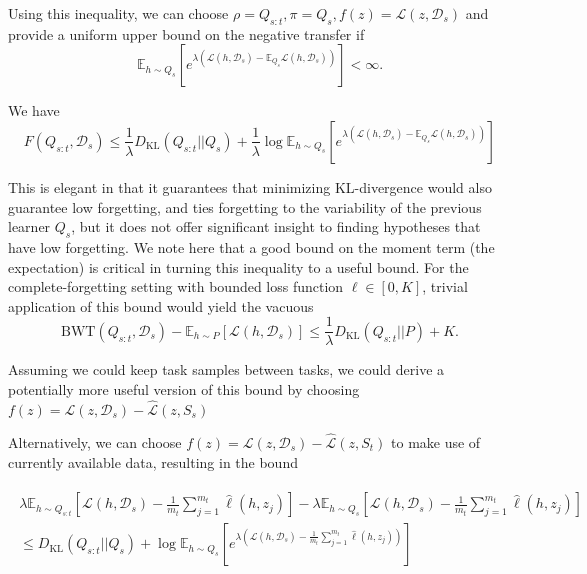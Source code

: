 \documentclass[letterpaper]{article}
\theoremstyle{definition}
\begin{document}
Using this inequality, we can choose $\rho=Q_{s:t}, \pi=Q_s, f(z)=\mathcal{L}(z,\mathcal{D}_s)$ and provide a uniform upper bound on the negative transfer if $$\mathbb{E}_{h\sim Q_s}\left [e^{\lambda(\mathcal{L}(h,\mathcal{D}_s)-\mathbb{E}_{Q_s} \mathcal{L}(h,\mathcal{D}_s))} \right ]<\infty.$$

We have 
\begin{equation}
F(Q_{s:t},\mathcal{D}_s)\leq \frac{1}{\lambda}D_{\mathrm{KL}}(Q_{s:t}||Q_s)+\frac{1}{\lambda}\log\mathbb{E}_{h\sim Q_s}\left [e^{\lambda(\mathcal{L}(h,\mathcal{D}_s)-\mathbb{E}_{Q_s} \mathcal{L}(h,\mathcal{D}_s))} \right ]
\end{equation}

This is elegant in that it guarantees that minimizing KL-divergence would also guarantee low forgetting, and ties forgetting to the variability of the previous learner $Q_s$, but it does not offer significant insight to finding hypotheses that have low forgetting. We note here that a good bound on the moment term (the expectation) is critical in turning this inequality to a useful bound. For the complete-forgetting setting with bounded loss function $\ell\in [0,K]$, trivial application of this bound would yield the vacuous $$\mathrm{BWT}(Q_{s:t},\mathcal{D}_s)-\mathbb{E}_{h\sim P}\left [\mathcal{L}(h,\mathcal{D}_s)\right ]\leq  \frac{1}{\lambda}D_{\mathrm{KL}}(Q_{s:t}||P)+K.$$

Assuming we could keep task samples between tasks, we could derive a potentially more useful version of this bound by choosing $f(z)=\mathcal{L}(z,\mathcal{D}_s)-\hat{\mathcal{L}}(z,S_s)$ %

Alternatively, we can choose $f(z)=\mathcal{L}(z,\mathcal{D}_s)-\hat{\mathcal{L}}(z,S_t)$ to make use of currently available data, resulting in the bound 


\begin{align*}
\begin{split}
\lambda\mathbb{E}_{h\sim Q_{s:t}}\left [\mathcal{L}(h,\mathcal{D}_s)-\frac{1}{m_t}\sum_{j=1}^{m_t}\hat{\ell}(h,z_j) \right ] - \lambda\mathbb{E}_{h\sim Q_{s}}\left [\mathcal{L}(h,\mathcal{D}_s)-\frac{1}{m_t}\sum_{j=1}^{m_t}\hat{\ell}(h,z_j) \right ] \\
\leq D_{\mathrm{KL}}(Q_{s:t}||Q_{s})+\log\mathbb{E}_{h\sim Q_{s}}\left [e^{\lambda(\mathcal{L}(h,\mathcal{D}_s)-\frac{1}{m_t}\sum_{j=1}^{m_t}\hat{\ell}(h,z_j))} \right ]
\end{split}
\end{align*}
\end{document}
